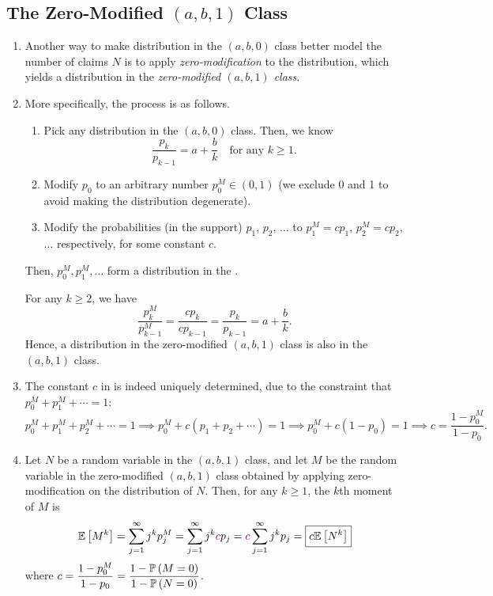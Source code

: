 \subsection{The Zero-Modified \((a,b,1)\) Class}
\begin{enumerate}
\item Another way to make distribution in the \((a,b,0)\) class better model
the number of claims \(N\) is to apply \emph{zero-modification} to the
distribution, which yields a distribution in the \emph{zero-modified
\((a,b,1)\) class}.
\item \label{it:zero-modify-process}
More specifically, the  process is as follows.
\begin{enumerate}
\item Pick any distribution in the \((a,b,0)\) class. Then, we know
\[
\frac{p_k}{p_{k-1}}=a+\frac{b}{k}\quad\text{for any \(k\ge 1\)}.
\]
\item Modify \(p_0\) to an arbitrary number \(p_0^{M}\in(0,1)\) (we exclude 0
and 1 to avoid making the distribution degenerate).
\item Modify the probabilities (in the support) \(p_1\), \(p_2\), \(\dotsc\) to
\(p_1^M=cp_1\), \(p_2^M=cp_2\),\(\dotsc\) respectively, for some constant
\(c\).
\end{enumerate}
Then, \(p_0^M,p_1^M,\dotsc\) form a distribution in the .

\begin{note}
For any \(k\ge 2\), we have
\[
\frac{p_k^M}{p_{k-1}^M}=\frac{cp_k}{cp_{k-1}}=\frac{p_k}{p_{k-1}}=a+\frac{b}{k}.
\]
Hence, a distribution in the zero-modified \((a,b,1)\) class is also in the
\((a,b,1)\) class.
\end{note}
\item \label{it:zm-const-c-fmla}
The constant \(c\) in  is indeed
uniquely determined, due to the constraint that \(p_0^M+p_1^M+\dotsb=1\):
\[
p_0^M+p_1^M+p_2^M+\dotsb=1
\implies
p_0^M+c(p_1+p_2+\dotsb)=1
\implies
p_0^M+c(1-p_0)=1
\implies
c=\boxed{\frac{1-p_0^M}{1-p_0}}.
\]
\item \label{it:zm-kth-moment}
Let \(N\) be a random variable in the \((a,b,1)\) class, and let \(M\) be
the random variable in the zero-modified \((a,b,1)\) class obtained by applying
zero-modification on the distribution of \(N\). Then, for any \(k\ge 1\), the
\(k\)th moment of \(M\) is
\[
\mathbb{E}\left[M^k\right]=\sum_{j=1}^{\infty}j^kp_j^M 
=\sum_{j=1}^{\infty}j^k {\color{violet}c}p_j
={\color{violet}c}\sum_{j=1}^{\infty}j^k p_j
=\boxed{c\mathbb{E}\left[N^k\right]}
\]
where \(\displaystyle c=\frac{1-p_0^M}{1-p_0}=\frac{1-\mathbb{P}\left(M=0\right)}{1-\mathbb{P}\left(N=0\right)}\).


\end{enumerate}
